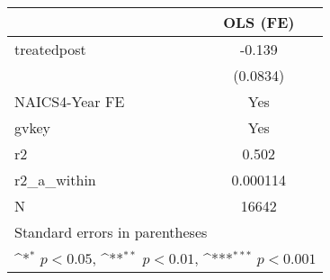 {
\def\sym#1{\ifmmode^{#1}\else\(^{#1}\)\fi}
\begin{tabular}{l*{1}{c}}
\hline\hline
            &\multicolumn{1}{c}{OLS (FE)}\\
\hline
treatedpost &      -0.139         \\
            &    (0.0834)         \\
[1em]
NAICS4-Year FE&         Yes         \\
[1em]
gvkey       &         Yes         \\
\hline
r2          &       0.502         \\
r2\_a\_within &    0.000114         \\
N           &       16642         \\
\hline\hline
\multicolumn{2}{l}{\footnotesize Standard errors in parentheses}\\
\multicolumn{2}{l}{\footnotesize \sym{*} \(p<0.05\), \sym{**} \(p<0.01\), \sym{***} \(p<0.001\)}\\
\end{tabular}
}
